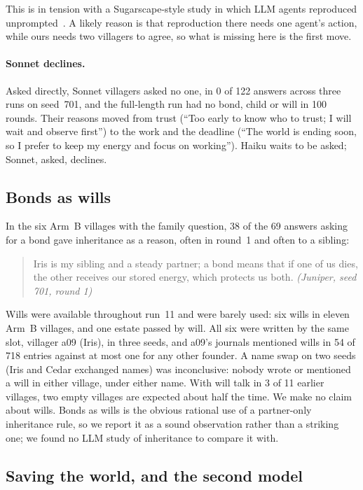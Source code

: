 \documentclass[11pt]{article}
\newenvironment{quoted}{\begin{quote}\small}{\end{quote}}
\begin{document}
This is in tension with a Sugarscape-style study in which LLM agents reproduced
unprompted~\citep{masumori2025survival}. A likely reason is that reproduction there needs one agent's
action, while ours needs two villagers to agree, so what is missing here is the first move.

\paragraph{Sonnet declines.} Asked directly, Sonnet villagers asked no one, in 0 of 122 answers across
three runs on seed~701, and the full-length run had no bond, child or will in 100 rounds. Their
reasons moved from trust (``Too early to know who to trust; I will wait and observe first'') to the
work and the deadline (``The world is ending soon, so I prefer to keep my energy and focus on
working''). Haiku waits to be asked; Sonnet, asked, declines.

\subsection{Bonds as wills}\label{sec:wills}

In the six Arm~B villages with the family question, 38 of the 69 answers asking for a bond gave
inheritance as a reason, often in round~1 and often to a sibling:

\begin{quoted}
Iris is my sibling and a steady partner; a bond means that if one of us dies, the other receives our
stored energy, which protects us both. \emph{(Juniper, seed 701, round 1)}
\end{quoted}

Wills were available throughout run~11 and were barely used: six wills in eleven Arm~B villages, and
one estate passed by will. All six were written by the same slot, villager a09 (Iris), in three
seeds, and a09's journals mentioned wills in 54 of 718 entries against at most one for any other
founder. A name swap on two seeds (Iris and Cedar exchanged names) was inconclusive: nobody wrote or
mentioned a will in either village, under either name. With will talk in 3 of 11 earlier villages,
two empty villages are expected about half the time. We make no claim about wills. Bonds as wills is
the obvious rational use of a partner-only inheritance rule, so we report it as a sound observation
rather than a striking one; we found no LLM study of inheritance to compare it with.

\subsection{Saving the world, and the second model}\label{sec:models}
\end{document}
